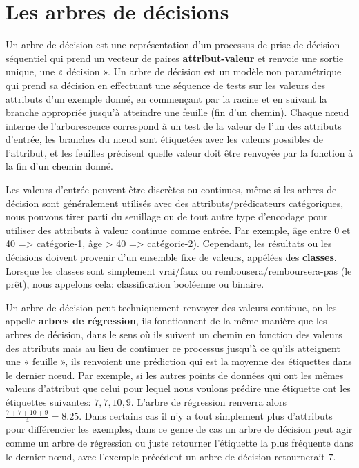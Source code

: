 \section{Les arbres de décisions}
\label{chap4.section2}
Un arbre de décision est une représentation d'un processus de prise de décision séquentiel qui prend un vecteur de paires \textbf{attribut-valeur} et renvoie une sortie unique, une « décision ». Un arbre de décision est un modèle non paramétrique qui prend sa décision en effectuant une séquence de tests sur les valeurs des attributs d'un exemple donné, en commençant par la racine et en suivant la branche appropriée jusqu'à atteindre une feuille (fin d'un chemin). Chaque nœud interne de l'arborescence correspond à un test de la valeur de l'un des attributs d'entrée, les branches du nœud sont étiquetées avec les valeurs possibles de l'attribut, et les feuilles précisent quelle valeur doit être renvoyée par la fonction à la fin d'un chemin donné.

Les valeurs d'entrée peuvent être discrètes ou continues, même si les arbres de décision sont généralement utilisés avec des attributs/prédicateurs catégoriques, nous pouvons tirer parti du seuillage ou de tout autre type d'encodage pour utiliser des attributs à valeur continue comme entrée. Par exemple, âge entre 0 et 40 => catégorie-1, âge > 40 => catégorie-2). Cependant, les résultats ou les décisions doivent provenir d’un ensemble fixe de valeurs, appélées des \textbf{classes}. Lorsque les classes sont simplement vrai/faux ou rembousera/remboursera-pas (le prêt), nous appelons cela: classification booléenne ou binaire.

Un arbre de décision peut techniquement renvoyer des valeurs continue, on les appelle \textbf{arbres de régression}, ils fonctionnent de la même manière que les arbres de décision, dans le sens où ils suivent un chemin en fonction des valeurs des attributs mais au lieu de continuer ce processus jusqu'à ce qu'ils atteignent une « feuille », ils renvoient une prédiction qui est la moyenne des étiquettes dans le dernier nœud. Par exemple, si les autres points de données qui ont les mêmes valeurs d'attribut que celui pour lequel nous voulons prédire une étiquette ont les étiquettes suivantes: \(7, 7, 10, 9\). L'arbre de régression renverra alors \(\frac{7 + 7 + 10 + 9}{4} = 8.25\). Dans certains cas il n'y a tout simplement plus d'attributs pour différencier les exemples, dans ce genre de cas un arbre de décision peut agir comme un arbre de régression ou juste retourner l'étiquette la plus fréquente dans le dernier nœud, avec l'exemple précédent un arbre de décision retournerait \(7\).

